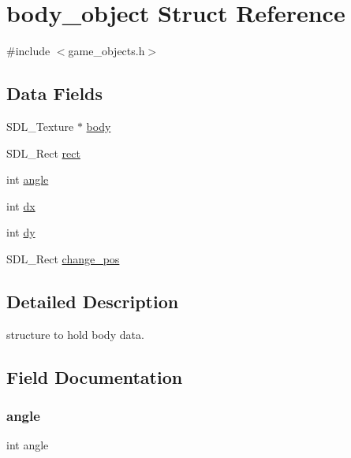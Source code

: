 \hypertarget{structbody__object}{}\section{body\+\_\+object Struct Reference}
\label{structbody__object}


{\ttfamily \#include $<$game\+\_\+objects.\+h$>$}

\subsection*{Data Fields}
\begin{DoxyCompactItemize}
\item 
S\+D\+L\+\_\+\+Texture $\ast$ \mbox{\hyperlink{structbody__object_a78cbc3f4a306ce98ce51b731549a5cf0}{body}}
\item 
S\+D\+L\+\_\+\+Rect \mbox{\hyperlink{structbody__object_a55aefd071649ac9dd8133e2d8a52d11f}{rect}}
\item 
int \mbox{\hyperlink{structbody__object_a63177970cacb40efba67ce501ea89210}{angle}}
\item 
int \mbox{\hyperlink{structbody__object_a6a0d40b2ed6d9e674f93396212f0028f}{dx}}
\item 
int \mbox{\hyperlink{structbody__object_a4817151aee120cc100c400d3076f4b93}{dy}}
\item 
S\+D\+L\+\_\+\+Rect \mbox{\hyperlink{structbody__object_a7abd7a5b88f5115b8c83092f283b8c83}{change\+\_\+pos}}
\end{DoxyCompactItemize}


\subsection{Detailed Description}
structure to hold body data. 

\subsection{Field Documentation}
\mbox{\label{structbody__object_a63177970cacb40efba67ce501ea89210}} 
\subsubsection{\texorpdfstring{angle}{angle}}
{\footnotesize\ttfamily int angle}

